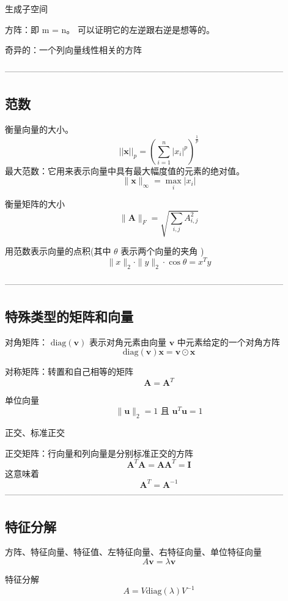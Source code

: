 \documentclass{article}
\begin{document}
生成子空间

方阵：即 m = n。 可以证明它的左逆跟右逆是想等的。

奇异的：一个列向量线性相关的方阵

--------------------------------------------------------------------------------------------------

\subsection{范数}
衡量向量的大小。
$$
||\mathbf{x}||_p = \left( \sum_{i=1}^n |x_i|^p \right)^{\frac{1}{p}}
$$
最大范数：它用来表示向量中具有最大幅度值的元素的绝对值。
$$
\| \boldsymbol{x} \|_{\infty} = \max_i | x_i |
$$

衡量矩阵的大小
\begin{equation}
    \| \mathbf{A} \|_F = \sqrt{\sum_{i,j} A_{i,j}^2}
\end{equation}

用范数表示向量的点积(其中 $\theta$ 表示两个向量的夹角 )
$$\|x\|_2 \cdot \|y\|_2 \cdot \cos \theta = x^T y$$

--------------------------------------------------------------------------------------------------
\subsection{特殊类型的矩阵和向量}
对角矩阵： $\text{diag}(\mathbf{v})$ 表示对角元素由向量 $\mathbf{v}$ 中元素给定的一个对角方阵
$$\text{diag}(\mathbf{v})\mathbf{x} = \mathbf{v} \odot \mathbf{x} $$

对称矩阵：转置和自己相等的矩阵
$$\mathbf{A} = \mathbf{A}^T$$

单位向量
$$\|\mathbf{u}\|_2 = 1 \text{ 且 } \mathbf{u}^T\mathbf{u}=1$$

正交、标准正交

正交矩阵：行向量和列向量是分别标准正交的方阵
$$
\boldsymbol{A}^T \boldsymbol{A} = \boldsymbol{A} \boldsymbol{A}^T = \boldsymbol{I}
$$
这意味着
$$
\boldsymbol{A}^T = \boldsymbol{A}^{-1}
$$
--------------------------------------------------------------------------------------------------
\subsection{特征分解}
方阵、特征向量、特征值、左特征向量、右特征向量、单位特征向量
$$A \mathbf{v} = \lambda \mathbf{v}$$

特征分解
$$A = V \text{diag}(\lambda) V^{-1}$$
\end{document}
